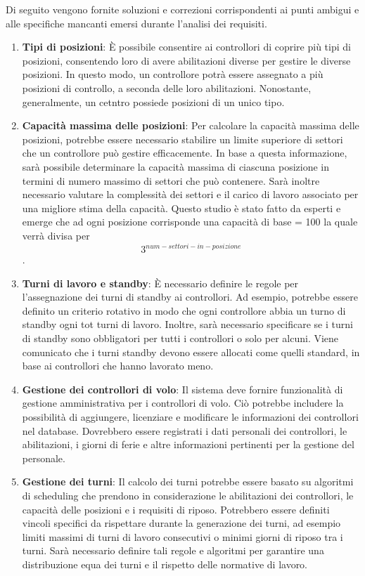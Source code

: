 Di seguito vengono fornite soluzioni e correzioni corrispondenti ai punti ambigui e alle specifiche mancanti emersi durante l'analisi dei requisiti.

\begin{enumerate}
\item \textbf{Tipi di posizioni}: È possibile consentire ai controllori di coprire più tipi di posizioni, consentendo loro di avere abilitazioni diverse per gestire le diverse posizioni. In questo modo, un controllore potrà essere assegnato a più posizioni di controllo, a seconda delle loro abilitazioni. Nonostante, generalmente, un cetntro possiede posizioni di un unico tipo.

\item \textbf{Capacità massima delle posizioni}: Per calcolare la capacità massima delle posizioni, potrebbe essere necessario stabilire un limite superiore di settori che un controllore può gestire efficacemente. In base a questa informazione, sarà possibile determinare la capacità massima di ciascuna posizione in termini di numero massimo di settori che può contenere. Sarà inoltre necessario valutare la complessità dei settori e il carico di lavoro associato per una migliore stima della capacità. Questo studio è stato fatto da esperti e emerge che ad ogni posizione corrisponde una capacità di base = 100 la quale verrà divisa per \[  3^{num-settori-in-posizione} \].

\item \textbf{Turni di lavoro e standby}: È necessario definire le regole per l'assegnazione dei turni di standby ai controllori. Ad esempio, potrebbe essere definito un criterio rotativo in modo che ogni controllore abbia un turno di standby ogni tot turni di lavoro. Inoltre, sarà necessario specificare se i turni di standby sono obbligatori per tutti i controllori o solo per alcuni. Viene comunicato che i turni standby devono essere allocati come quelli standard, in base ai controllori che hanno lavorato meno.

\item \textbf{Gestione dei controllori di volo}: Il sistema deve fornire funzionalità di gestione amministrativa per i controllori di volo. Ciò potrebbe includere la possibilità di aggiungere, licenziare e modificare le informazioni dei controllori nel database. Dovrebbero essere registrati i dati personali dei controllori, le abilitazioni, i giorni di ferie e altre informazioni pertinenti per la gestione del personale.

\item \textbf{Gestione dei turni}: Il calcolo dei turni potrebbe essere basato su algoritmi di scheduling che prendono in considerazione le abilitazioni dei controllori, le capacità delle posizioni e i requisiti di riposo. Potrebbero essere definiti vincoli specifici da rispettare durante la generazione dei turni, ad esempio limiti massimi di turni di lavoro consecutivi o minimi giorni di riposo tra i turni. Sarà necessario definire tali regole e algoritmi per garantire una distribuzione equa dei turni e il rispetto delle normative di lavoro.


\end{enumerate}
